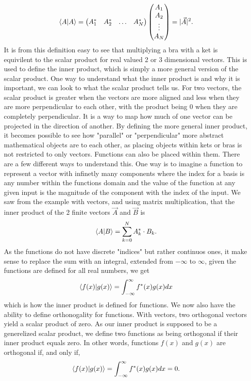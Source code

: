 \begin{align*}
    \braket{A}{A}=\begin{pmatrix}
        A_1^* &A_2^* & \dots&A_N^*
    \end{pmatrix} \begin{pmatrix}
         A_1\\
    A_2\\
    \vdots\\
    A_N
    \end{pmatrix}=|\vec{A}|^2.
\end{align*} It is from this definition easy to see that multiplying a bra with a ket is equivilent to the scalar product for real valued 2 or 3 dimensional vectors. This is used to define the inner product, which is simply a more general version of the scalar product. One way to understand what the inner product is and why it is important, we can look to what the scalar product tells us. For two vectors, the scalar product is greater when the vectors are more aligned and less when they are more perpendicular to each other, with the product being 0 when they are completely perpendicular. It is a way to map how much of one vector can be projected in the direction of another. By defining the more general inner product, it becomes possible to see how "parallel" or "perpendicular" more abstract mathematical objects are to each other, as placing objects within kets or bras is not restricted to only vectors. Functions can also be placed within them. There are a few different ways to understand this. One way is to imagine a function to represent a vector with infinetly many components where the index for a basis is any number within the functions domain and the value of the function at any given input is the magnitude of the component with the index of the input. We saw from the example with vectors, and using matrix multiplication, that the inner product of the 2 finite vectors $\vec{A}$ and $\vec{B}$ is \begin{align*}
    \braket{A}{B}=\sum_{k=0}^NA^*_k\cdot B_k.
\end{align*} As the functions do not have discrete "indices" but rather continuos ones, it make sense to replace the sum with an integral, extended from $-\infty$ to $\infty$, given the functions are defined for all real numbers, we get \begin{align*}
    \braket{f(x)}{g(x)}=\int_{-\infty}^{\infty}f^*(x)g(x)dx
\end{align*} which is how the inner product is defined for functions. We now also have the ability to define orthonogality for functions. With vectors, two orthogonal vectors yield a scalar product of zero. As our inner product is supposed to be a generelized scalar product, we define two functions as being orthogonal if their inner product equals zero. In other words, functions $f(x)$ and $g(x)$ are orthogonal if, and only if, 
\begin{align*}
    \braket{f(x)}{g(x)} = \int_{-\infty}^{\infty} f^*(x)g(x)dx = 0.
\end{align*}


